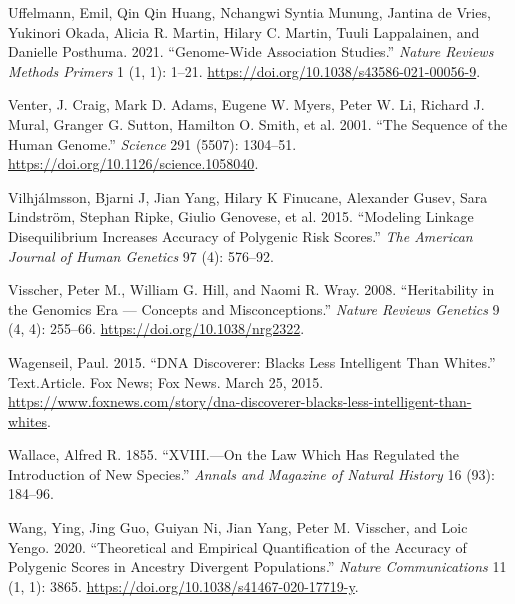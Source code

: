 \documentclass[
]{book}
\newlength{\cslhangindent}
\newlength{\cslentryspacingunit} %
\newenvironment{CSLReferences}[2] %
 {%
  \setlength{\parindent}{0pt}
  \ifodd #1
  \let\oldpar\par
  \def\par{\hangindent=\cslhangindent\oldpar}
  \fi
  \setlength{\parskip}{#2\cslentryspacingunit}
 }%
 {}
\begin{document}
\begin{CSLReferences}{1}{0}
\leavevmode{}%
Uffelmann, Emil, Qin Qin Huang, Nchangwi Syntia Munung, Jantina de Vries, Yukinori Okada, Alicia R. Martin, Hilary C. Martin, Tuuli Lappalainen, and Danielle Posthuma. 2021. {``Genome-Wide Association Studies.''} \emph{Nature Reviews Methods Primers} 1 (1, 1): 1--21. \url{https://doi.org/10.1038/s43586-021-00056-9}.

\leavevmode{}%
Venter, J. Craig, Mark D. Adams, Eugene W. Myers, Peter W. Li, Richard J. Mural, Granger G. Sutton, Hamilton O. Smith, et al. 2001. {``The {Sequence} of the {Human Genome}.''} \emph{Science} 291 (5507): 1304--51. \url{https://doi.org/10.1126/science.1058040}.

\leavevmode{}%
Vilhjálmsson, Bjarni J, Jian Yang, Hilary K Finucane, Alexander Gusev, Sara Lindström, Stephan Ripke, Giulio Genovese, et al. 2015. {``Modeling Linkage Disequilibrium Increases Accuracy of Polygenic Risk Scores.''} \emph{The American Journal of Human Genetics} 97 (4): 576--92.

\leavevmode{}%
Visscher, Peter M., William G. Hill, and Naomi R. Wray. 2008. {``Heritability in the Genomics Era --- Concepts and Misconceptions.''} \emph{Nature Reviews Genetics} 9 (4, 4): 255--66. \url{https://doi.org/10.1038/nrg2322}.

\leavevmode{}%
Wagenseil, Paul. 2015. {``{DNA Discoverer}: {Blacks Less Intelligent Than Whites}.''} Text.Article. {Fox News}; {Fox News}. March 25, 2015. \url{https://www.foxnews.com/story/dna-discoverer-blacks-less-intelligent-than-whites}.

\leavevmode{}%
Wallace, Alfred R. 1855. {``{XVIII}.---{On} the Law Which Has Regulated the Introduction of New Species.''} \emph{Annals and Magazine of Natural History} 16 (93): 184--96.

\leavevmode{}%
Wang, Ying, Jing Guo, Guiyan Ni, Jian Yang, Peter M. Visscher, and Loic Yengo. 2020. {``Theoretical and Empirical Quantification of the Accuracy of Polygenic Scores in Ancestry Divergent Populations.''} \emph{Nature Communications} 11 (1, 1): 3865. \url{https://doi.org/10.1038/s41467-020-17719-y}.


\end{CSLReferences}
\end{document}
